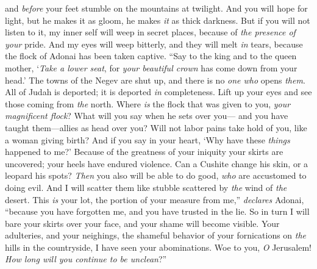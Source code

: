 \begin{biblechapter}
and \textit{before} your feet stumble on the mountains at twilight. 
And you will hope for light, but he makes it as gloom, 
he makes \textit{it} as thick darkness.
\verse But if you will not listen to it, 
my inner self will weep in secret places, 
because of \textit{the presence of} \textit{your} pride. 
And my eyes will weep bitterly, 
and they will melt \textit{in} tears, 
because the flock of Adonai has been taken captive.
 “Say to the king and to the queen mother, ‘\textit{Take a lower seat}, 
for \textit{your beautiful crown} has come down from your head.’
\verse The towns of the Negev are shut up, 
and there is no \textit{one who} opens \textit{them}. 
All of Judah is deported; 
it is deported \textit{in} completeness.
\verse Lift up your eyes 
and see those coming from \textit{the} north. 
Where \textit{is} the flock that was given to you, 
\textit{your magnificent flock}?
\verse What will you say when he sets over you— 
and you have taught them—allies as head over you? 
Will not labor pains take hold of you, 
like a woman giving birth?
\verse And if you say in your heart, 
‘Why have these \textit{things} happened to me?’ 
Because of the greatness of your iniquity your skirts are uncovered; 
your heels have endured violence.
\verse Can a Cushite change his skin, 
or a leopard his spots? 
\textit{Then} you also will be able to do good, 
\textit{who} are accustomed to doing evil.
\verse And I will scatter them 
like stubble scattered by \textit{the} wind of \textit{the} desert.
\verse This \textit{is} your lot, 
the portion of your measure from me,” \textit{declares} Adonai, 
“because you have forgotten me, 
and you have trusted in the lie.
\verse So in turn I will bare your skirts over your face, 
and your shame will become visible.
\verse Your adulteries, and your neighings, 
the shameful behavior of your fornications 
on \textit{the} hills in the countryside, 
I have seen your abominations. 
Woe to you, \textit{O} Jerusalem! 
\textit{How long will you continue to be unclean}?”
\end{biblechapter}

